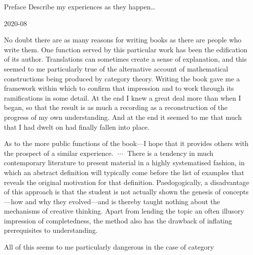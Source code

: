 \begin{plSection}{Preface}
\label{sec:Preface}
Describe my experiences as they happen\ldots
\begin{plSection}{2020-08}
\label{sec:2020-08}

\begin{plQuote}
{}
{}
No doubt there are as many reasons for writing books as there are people
who write them. One function served by this particular work has been the
edification of its author. Translations can sometimes create a sense of
explanation, and this seemed to me particularly true of the alternative
account of mathematical constructions being produced by category
theory. Writing the book gave me a framework within which to confirm
that impression and to work through its ramifications in some detail. At
the end I knew a great deal more than when I began, so that the result is
as much a recording as a reconstruction of the progress of my own
understanding. And at the end it seemed to me that much that I had
dwelt on had finally fallen into place.
\par
As to the more public functions of the book---I hope that it provides
others with the prospect of a similar experience. 
$\;\cdots\;$ 
There is a tendency in much contemporary literature to present material
in a highly systematised fashion, in which an abstract definition will
typically come before the list of examples that reveals the original
motivation for that definition. Paedogogically, a disadvantage of this
approach is that the student is not actually shown the genesis of 
concepts---how and why they evolved---and 
is thereby taught nothing about the
mechanisms of creative thinking. Apart from lending the topic an often
illusory impression of completedness, the method also has the drawback
of inflating prerequisites to understanding.
\par
All of this seems to me particularly dangerous in the case of category

\end{plQuote}
\end{plSection}
\end{plSection}
